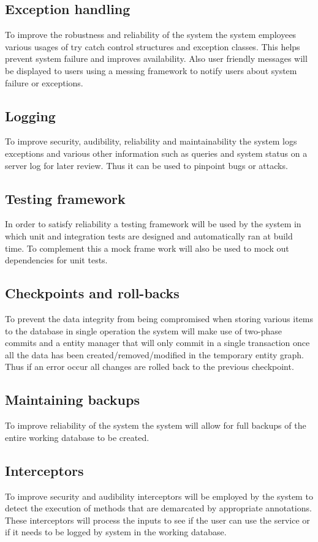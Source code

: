 \documentclass[12pt]{article}
\begin{document}
\subsection{Exception handling}
To improve the robustness and reliability of the system the system employees various usages of try catch control structures and exception classes. This helps prevent system failure and improves availability. Also user friendly messages will be displayed to users using a messing framework to notify users about system failure or exceptions.

\subsection{Logging}
To improve security, audibility, reliability and maintainability the system logs exceptions and various other information such as queries and system status on a server log for later review. Thus it can be used to pinpoint bugs or attacks.

\subsection{Testing framework}
In order to satisfy reliability a testing framework will be used by the system in which unit and integration tests are designed and automatically ran at build time. To complement this a mock frame work will also be used to mock out dependencies for unit tests.

\subsection{Checkpoints and roll-backs}
To prevent the data integrity from being compromised when storing various items to the database in single operation the system will make use of two-phase commits and a entity manager that will only commit in a single transaction once all the data has been created/removed/modified in the temporary entity graph. Thus if an error occur all changes are rolled back to the previous checkpoint.

\subsection{Maintaining backups}
To improve reliability of the system the system will allow for full backups of the entire working database to be created.

\subsection{Interceptors}
To improve security and audibility interceptors will be employed by the system to detect the execution of methods that are demarcated by appropriate annotations. These interceptors will process the inputs to see if the user can use the service or if it needs to be logged by system in the working database. 
\end{document}
